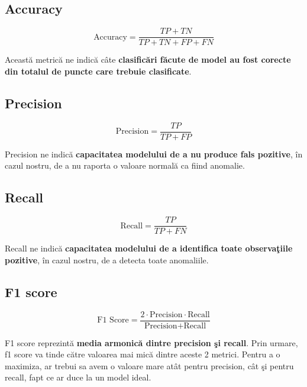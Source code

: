 \subsection{Accuracy}

\begin{equation}
    \text{Accuracy} = \frac{TP + TN}{TP + TN + FP + FN}
\end{equation}

Această metrică ne indică câte 
\textbf{clasificări făcute de model au fost corecte din 
totalul de puncte care trebuie clasificate}.

\subsection{Precision}

\begin{equation}
    \text{Precision} = \frac{TP}{TP + FP}
\end{equation}

Precision ne indică \textbf{capacitatea modelului de a nu produce fals pozitive}, în cazul nostru,
de a nu raporta o valoare normală ca fiind anomalie.

\subsection{Recall}

\begin{equation}
    \text{Recall} = \frac{TP}{TP + FN}
\end{equation}

Recall ne indică 
\textbf{capacitatea modelului de a identifica toate observaţiile pozitive},
în cazul nostru, de a detecta toate anomaliile.

\subsection{F1 score}

\begin{equation}
    \text{F1 Score} = \frac{2 \cdot \text{Precision} \cdot \text{Recall}}{\text{Precision} + \text{Recall}}
\end{equation}

F1 score reprezintă \textbf{media armonică dintre precision şi recall}. Prin urmare, f1 score 
va tinde către valoarea mai mică dintre aceste 2 metrici. Pentru a o maximiza,
ar trebui sa avem o valoare mare atât pentru precision, cât şi pentru recall,
fapt ce ar duce la un model ideal.

